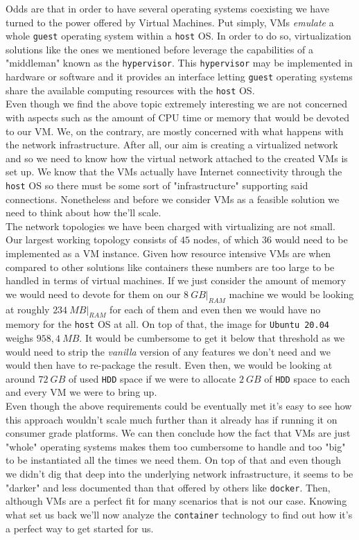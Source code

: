                 Odds are that in order to have several operating systems coexisting we have turned to the power offered by Virtual Machines. Put simply, VMs \textit{emulate} a whole \texttt{guest} operating system within a \texttt{host} OS. In order to do so, virtualization solutions like the ones we mentioned before leverage the capabilities of a "middleman" known as the \texttt{hypervisor}. This \texttt{hypervisor} may be implemented in hardware or software and it provides an interface letting \texttt{guest} operating systems share the available computing resources with the \texttt{host} OS.\\

                Even though we find the above topic extremely interesting we are not concerned with aspects such as the amount of CPU time or memory that would be devoted to our VM. We, on the contrary, are mostly concerned with what happens with the network infrastructure. After all, our aim is creating a virtualized network and so we need to know how the virtual network attached to the created VMs is set up. We know that the VMs actually have Internet connectivity through the \texttt{host} OS so there must be some sort of "infrastructure" supporting said connections. Nonetheless and before we consider VMs as a feasible solution we need to think about how the'll scale.\\

                The network topologies we have been charged with virtualizing are not small. Our largest working topology consists of $45$ nodes, of which $36$ would need to be implemented as a VM instance. Given how resource intensive VMs are when compared to other solutions like containers these numbers are too large to be handled in terms of virtual machines. If we just consider the amount of memory we would need to devote for them on our $8\ GB\rvert_{RAM}$ machine we would be looking at roughly $234\ MB\rvert_{RAM}$ for each of them and even then we would have no memory for the \texttt{host} OS at all. On top of that, the image for \texttt{Ubuntu 20.04} weighs $958,4\ MB$. It would be cumbersome to get it below that threshold as we would need to strip the \textit{vanilla} version of any features we don't need and we would then have to re-package the result. Even then, we would be looking at around $72\ GB$ of used \texttt{HDD} space if we were to allocate $2\ GB$ of \texttt{HDD} space to each and every VM we were to bring up.\\

                Even though the above requirements could be eventually met it's easy to see how this approach wouldn't scale much further than it already has if running it on consumer grade platforms. We can then conclude how the fact that VMs are just "whole" operating systems makes them too cumbersome to handle and too "big" to be instantiated all the times we need them. On top of that and even though we didn't dig that deep into the underlying network infrastructure, it seems to be "darker" and less documented than that offered by others like \texttt{docker}. Then, although VMs are a perfect fit for many scenarios that is not our case. Knowing what set us back we'll now analyze the \texttt{container} technology to find out how it's a perfect way to get started for us.

